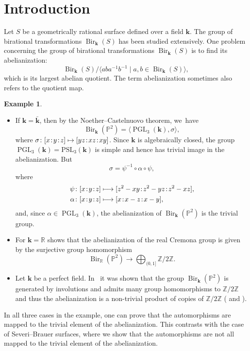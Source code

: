 \documentclass[JEP,XML,SOM,Unicode,NoFloatCountersInSection, NoEqCountersInSection,published]{cedram}
\newcommand\mto{\mathchoice{\longmapsto}{\mapsto}{\mapsto}{\mapsto}}
\newcommand{\sep}{\mkern2mu{:}\mkern2mu}
\theoremstyle{definition}
\newtheorem{example}[theorem]{Example}
\newcommand{\kk}{{\boldsymbol{k}}}
\DeclareMathOperator{\PGL}{PGL}
\DeclareMathOperator{\Bir}{Bir}
\begin{document}
\maketitle

\tableofcontents

\mainmatter
\section{Introduction}

Let $S$ be a geometrically rational surface defined over a field $\kk$. The group of birational transformations $\Bir_{\kk}(S)$ has been studied extensively. One problem concerning the group of birational transformations $\Bir_{\kk}(S)$ is to find its abelianization:
\[
\Bir_{\kk}(S) / \langle aba^{-1}b^{-1} \mid a,b \in \Bir_{\kk}(S) \rangle,
\]
which is its largest abelian quotient. The term abelianization sometimes also refers to the quotient map.
\skpt
\begin{example}
\begin{itemize}
\item If $\kk = \bar{\kk}$, then by the Noether--Castelnuovo theorem, we~have
\[
\Bir_{\kk}(\mathbb{P}^2) = \langle \PGL_3(\kk), \sigma \rangle,
\]
where $\sigma \colon [x\sep y\sep z] \mto [yz\sep xz\sep xy]$. Since $\kk$ is algebraically closed, the group $\PGL_3(\kk) = \mathrm{PSL}_3(\kk)$ is simple and hence has trivial image in the abelianization. But
\[
\sigma = \psi^{-1} \circ \alpha \circ \psi,
\]
where
\begin{align*}
\psi\colon [x\sep y\sep z] &\mto [z^2 - xy\sep  z^2 - yz\sep  z^2 - xz],
\\
\alpha\colon [x\sep y\sep z] &\mto [x\sep  x - z\sep  x - y],
\end{align*}
and, since $\alpha \in \PGL_3(\kk)$, the abelianization of $\Bir_{\kk}(\mathbb{P}^2)$ is the trivial group.

\item For $\kk = \mathbb{R}$ \cite{Zimmermann_2018} shows that the abelianization of the real Cremona group is given by the surjective group homomorphism
\[
\Bir_{\mathbb{R}}(\mathbb{P}^2) \to \bigoplus_{(0,1]} \mathbb{Z}/2\mathbb{Z}.
\]

\item Let $\kk$ be a perfect field. In~\cite{LamySchneider_2024} it was shown that the group $\Bir_{\kk}(\mathbb{P}^2)$ is generated by involutions and admits many group homomorphisms to $\mathbb{Z} / 2 \mathbb{Z}$ and thus the abelianization is a non-trivial product of copies of $\mathbb{Z}/2 \mathbb{Z}$ (\cite{Lamy_2020} and \cite{LamySchneider_2024}).
\end{itemize}
\end{example}
In all three cases in the example, one can prove that the automorphisms are mapped to the trivial element of the abelianization. This contrasts with the case of Severi--Brauer surfaces, where we show that the automorphisms are not all mapped to the trivial element of the abelianization.
\end{document}
